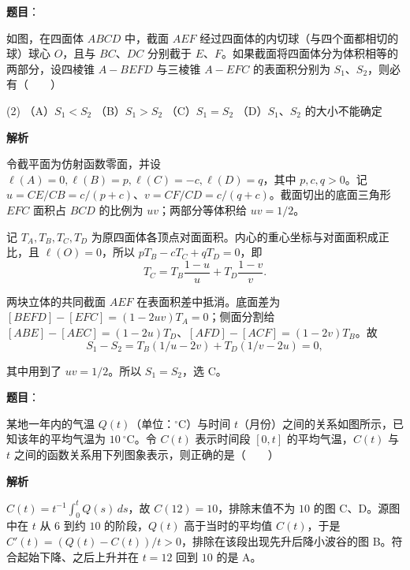 \begin{answer}

\textbf{题目}：

如图，在四面体 $ABCD$ 中，截面 $AEF$ 经过四面体的内切球（与四个面都相切的球）球心 $O$，且与 $BC\text{、}DC$ 分别截于 $E\text{、}F$。如果截面将四面体分为体积相等的两部分，设四棱锥 $A-BEFD$ 与三棱锥 $A-EFC$ 的表面积分别为 $S_1\text{、}S_2$，则必有\mbox{（　　）}

\begin{gkopts}(2)
\task （A）$S_1<S_2$
\task （B）$S_1>S_2$
\task （C）$S_1=S_2$
\task （D）$S_1\text{、}S_2$ 的大小不能确定
\end{gkopts}
\nopagebreak[4]
\begin{center}\end{center}
\nopagebreak[4]
\textbf{解析}

令截平面为仿射函数零面，并设 $\ell(A)=0,\ell(B)=p,\ell(C)=-c,\ell(D)=q$，其中 $p,c,q>0$。记 $u=CE/CB=c/(p+c)$、$v=CF/CD=c/(q+c)$。截面切出的底面三角形 $EFC$ 面积占 $BCD$ 的比例为 $uv$；两部分等体积给 $uv=1/2$。

记 $T_A,T_B,T_C,T_D$ 为原四面体各顶点对面面积。内心的重心坐标与对面面积成正比，且 $\ell(O)=0$，所以 $pT_B-cT_C+qT_D=0$，即
\nopagebreak[4]
\[
T_C=T_B\frac{1-u}{u}+T_D\frac{1-v}{v}.
\]

两块立体的共同截面 $AEF$ 在表面积差中抵消。底面差为 $[BEFD]-[EFC]=(1-2uv)T_A=0$；侧面分割给 $[ABE]-[AEC]=(1-2u)T_D$、$[AFD]-[ACF]=(1-2v)T_B$。故
\nopagebreak[4]
\[
S_1-S_2=T_B(1/u-2v)+T_D(1/v-2u)=0,
\]

其中用到了 $uv=1/2$。所以 $S_1=S_2$，选 C。


\end{answer}
\begin{answer}

\textbf{题目}：

某地一年内的气温 $Q(t)$（单位：$^\circ\mathrm C$）与时间 $t$（月份）之间的关系如图所示，已知该年的平均气温为 $10\ ^\circ\mathrm C$。令 $C(t)$ 表示时间段 $[0,t]$ 的平均气温，$C(t)$ 与 $t$ 之间的函数关系用下列图象表示，则正确的是\mbox{（　　）}
\nopagebreak[4]
\begin{center}\end{center}
\nopagebreak[4]
\textbf{解析}

$C(t)=t^{-1}\int_0^tQ(s)\,ds$，故 $C(12)=10$，排除末值不为 $10$ 的图 C、D。源图中在 $t$ 从 $6$ 到约 $10$ 的阶段，$Q(t)$ 高于当时的平均值 $C(t)$，于是 $C'(t)=(Q(t)-C(t))/t>0$，排除在该段出现先升后降小波谷的图 B。符合起始下降、之后上升并在 $t=12$ 回到 $10$ 的是 A。


\end{answer}
